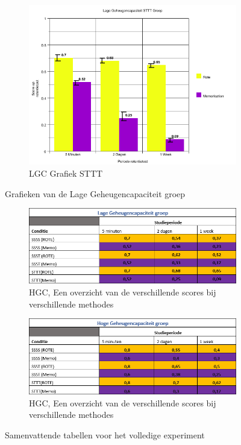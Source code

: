 \documentclass{hogent-article}
\begin{document}
\begin{figure}[H]
\begin{subfigure}{0.45\textwidth}
		\includegraphics[width=\linewidth]{graph6}
		\caption{LGC Grafiek STTT}
	\end{subfigure}
	\caption{Grafieken van de Lage Geheugencapaciteit groep}
\end{figure}
\begin{figure}[H]
	\begin{subfigure}{0.45\textwidth}
		\includegraphics[width=\linewidth]{table1}
		\caption{HGC, Een overzicht van de verschillende scores bij verschillende methodes }
	\end{subfigure}
	\begin{subfigure}{0.45\textwidth}
		\includegraphics[width=\linewidth]{table2}
		\caption{HGC, Een overzicht van de verschillende scores bij verschillende methodes}
	\end{subfigure}
	\caption{Samenvattende tabellen voor het volledige experiment}
\end{figure}
\end{document}

